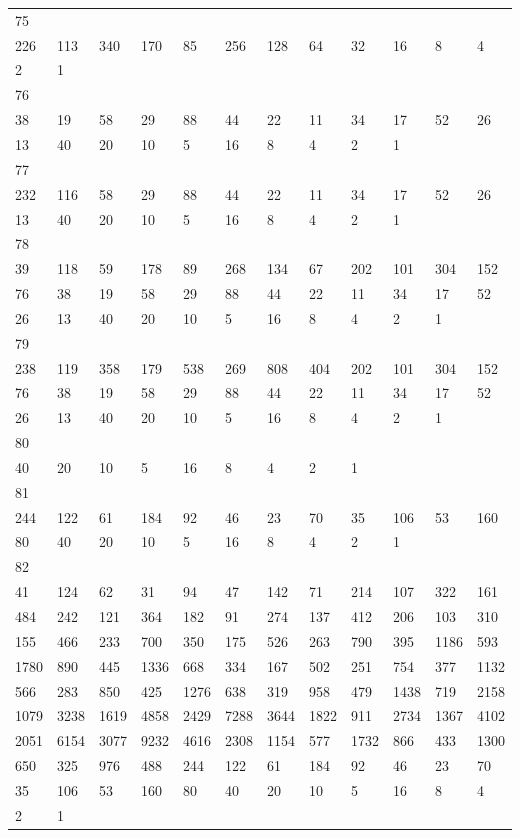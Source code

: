 \begin{longtable}{llllllllllll}
75&&&&&&&&&&&\\
226& 113& 340& 170& 85& 256& 128& 64& 32& 16& 8& 4\\
2& 1& \\

76&&&&&&&&&&&\\
38& 19& 58& 29& 88& 44& 22& 11& 34& 17& 52& 26\\
13& 40& 20& 10& 5& 16& 8& 4& 2& 1& \\

77&&&&&&&&&&&\\
232& 116& 58& 29& 88& 44& 22& 11& 34& 17& 52& 26\\
13& 40& 20& 10& 5& 16& 8& 4& 2& 1& \\

78&&&&&&&&&&&\\
39& 118& 59& 178& 89& 268& 134& 67& 202& 101& 304& 152\\
76& 38& 19& 58& 29& 88& 44& 22& 11& 34& 17& 52\\
26& 13& 40& 20& 10& 5& 16& 8& 4& 2& 1& \\

79&&&&&&&&&&&\\
238& 119& 358& 179& 538& 269& 808& 404& 202& 101& 304& 152\\
76& 38& 19& 58& 29& 88& 44& 22& 11& 34& 17& 52\\
26& 13& 40& 20& 10& 5& 16& 8& 4& 2& 1& \\

80&&&&&&&&&&&\\
40& 20& 10& 5& 16& 8& 4& 2& 1& \\

81&&&&&&&&&&&\\
244& 122& 61& 184& 92& 46& 23& 70& 35& 106& 53& 160\\
80& 40& 20& 10& 5& 16& 8& 4& 2& 1& \\

82&&&&&&&&&&&\\
41& 124& 62& 31& 94& 47& 142& 71& 214& 107& 322& 161\\
484& 242& 121& 364& 182& 91& 274& 137& 412& 206& 103& 310\\
155& 466& 233& 700& 350& 175& 526& 263& 790& 395& 1186& 593\\
1780& 890& 445& 1336& 668& 334& 167& 502& 251& 754& 377& 1132\\
566& 283& 850& 425& 1276& 638& 319& 958& 479& 1438& 719& 2158\\
1079& 3238& 1619& 4858& 2429& 7288& 3644& 1822& 911& 2734& 1367& 4102\\
2051& 6154& 3077& 9232& 4616& 2308& 1154& 577& 1732& 866& 433& 1300\\
650& 325& 976& 488& 244& 122& 61& 184& 92& 46& 23& 70\\
35& 106& 53& 160& 80& 40& 20& 10& 5& 16& 8& 4\\
2& 1& \\


\end{longtable}
